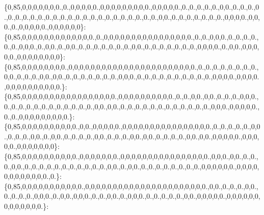 \{0,85,0,0,0,0,0,0,0.,0.,0,0,0,0,0.,0,0,0,0,0,0,0,0,0.,0,0,0,0,0.,0.,0.,0.,0.,0.,0,0.,0.,0.,0.,0.,0.,0.,0.,0.,0.,0.,0.,0.,0.,0.,0.,0.,0.,0.,0.,0.,0.,0.,0.,0.,0,0.,0.,0.,0.,0.,0.,0.,0.,0,0,0,0.,0,0,0.,0.,0,0,0,0,0.,0,0,0,0,0,0\}\+: \{0,85,0,0,0,0,0,0,0,0,0,0,0,0,0.,0.,0,0,0,0,0,0,0,0,0,0,0,0,0,0,0,0.,0.,0.,0,0,0.,0.,0.,0.,0.,0.,0.,0,0,0.,0.,0,0.,0.,0,0.,0.,0.,0.,0.,0.,0.,0.,0,0.,0.,0.,0.,0.,0.,0.,0.,0,0,0,0.,0.,0,0.,0,0,0,0,0.,0,0,0,0,0,0,0,0\}\+: \{0,85,0,0,0,0,0,0,0,0.,0,0,0,0,0,0,0,0,0,0,0,0,0,0,0,0,0,0,0,0,0,0,0.,0.,0.,0.,0.,0.,0.,0.,0.,0,0.,0.,0.,0.,0,0.,0,0.,0.,0.,0.,0.,0.,0.,0.,0,0,0.,0.,0.,0.,0.,0.,0.,0.,0.,0.,0.,0,0,0,0.,0,0,0,0.,0,0,0,0,0,0,0,0,0,0.\}\+: \{0,85,0,0,0,0,0,0,0,0,0,0,0,0,0,0,0,0,0.,0,0,0,0,0,0,0,0,0,0.,0.,0.,0,0.,0,0.,0.,0.,0.,0,0,0.,0.,0.,0.,0.,0.,0.,0.,0.,0.,0.,0.,0.,0,0.,0,0.,0.,0.,0.,0.,0.,0.,0.,0.,0.,0.,0.,0.,0,0,0.,0,0,0,0,0.,0.,0.,0,0,0,0,0,0,0,0,0.\}\+: \{0,85,0,0,0,0,0,0,0,0,0,0.,0,0.,0,0,0,0,0.,0,0,0,0,0,0,0,0,0,0,0,0,0,0,0,0.,0.,0.,0.,0.,0.,0,0.,0.,0.,0.,0,0.,0.,0,0.,0.,0.,0.,0.,0,0.,0.,0.,0.,0,0.,0,0.,0.,0.,0.,0.,0,0.,0,0.,0,0,0,0,0.,0,0,0,0,0.,0,0,0,0,0,0,0\}\+: \{0,85,0,0,0,0,0,0,0,0,0,0.,0,0,0,0,0,0,0.,0,0,0,0,0,0,0,0,0,0,0,0,0,0,0,0.,0,0,0.,0,0.,0.,0.,0.,0,0.,0.,0.,0.,0.,0.,0.,0.,0.,0.,0.,0.,0,0.,0.,0,0.,0.,0.,0.,0.,0.,0.,0.,0.,0,0,0,0,0,0.,0,0,0,0,0,0,0,0,0,0,0,0.,0.\}\+: \{0,85,0,0,0,0,0,0,0,0,0,0,0.,0,0,0,0,0,0,0,0,0,0,0,0,0,0,0,0,0,0,0,0,0,0.,0,0.,0.,0.,0.,0,0.,0.,0.,0.,0.,0,0,0.,0.,0,0.,0,0,0.,0.,0.,0,0.,0.,0,0,0.,0.,0.,0.,0.,0.,0,0.,0,0,0,0,0.,0,0,0,0,0,0,0,0,0,0,0,0,0.\}\+: 